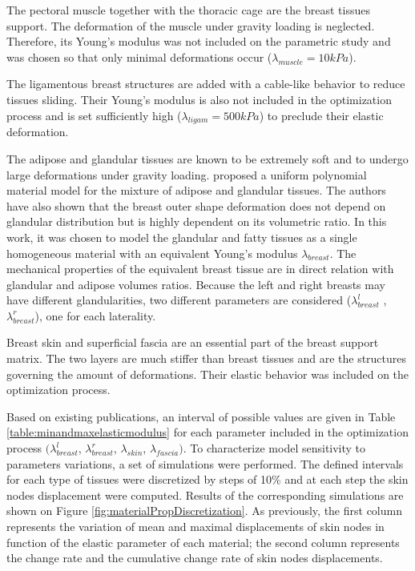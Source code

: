 The pectoral muscle together with the thoracic cage are the breast tissues support. The deformation of the muscle under gravity loading is neglected. Therefore, its Young's modulus was not included on the parametric study and was chosen so that only minimal deformations occur ($\lambda_{muscle}=10kPa$).

The ligamentous breast structures are added with a cable-like behavior to reduce tissues sliding. Their Young's modulus is also not included in the optimization process and is set sufficiently high ($\lambda_{ligam}=500kPa$) to preclude their elastic deformation. 

The adipose and glandular tissues are known to be extremely soft and to undergo large deformations under gravity loading.  \cite{calvo_polynomial_2015} proposed a uniform polynomial material model for the mixture of adipose and glandular tissues. The authors have also shown that the breast outer shape deformation does not depend on glandular distribution but is highly dependent on its volumetric ratio. In this work,  it was chosen to model the glandular and fatty tissues as a single homogeneous material with an equivalent Young's modulus $\lambda_{breast }$. The mechanical properties of the equivalent breast tissue are in direct relation with glandular and adipose volumes ratios. Because the left and right breasts may have different glandularities, two different parameters are considered ($\lambda_{breast}^l$ , $\lambda_{breast}^r$), one for each laterality.

Breast skin and superficial fascia are an essential part of the breast support matrix. The two layers are much stiffer than breast tissues and are the structures governing the amount of deformations. Their elastic behavior was included on the optimization process.

 Based on existing publications, an interval of possible values are given in Table \ref{table:minandmaxelasticmodulus} for each parameter included in the optimization process $(\lambda_{breast}^l$, $\lambda_{breast}^r$, $\lambda_{skin}$, $\lambda_{fascia})$. To characterize model sensitivity to parameters variations, a set of simulations were performed. The defined intervals for each type of tissues were discretized by steps of 10\% and at each step the skin nodes displacement were computed. Results of the corresponding simulations are shown on Figure  \ref{fig:materialPropDiscretization}. As previously, the first column represents the variation of mean and maximal displacements of skin nodes in function of the elastic parameter of each material; the second column represents the change rate and the cumulative change rate of skin nodes displacements.


